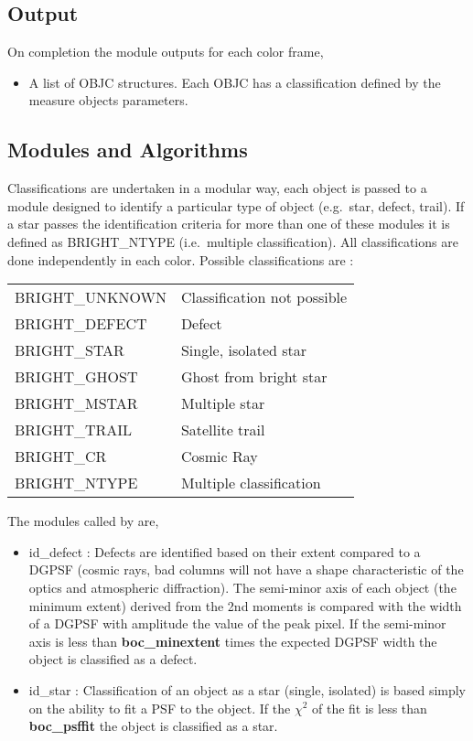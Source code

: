 \subsection{Output}
 
On completion the \bom module outputs for each color frame,
 
\begin{itemize}
 
\item A list of OBJC structures. Each OBJC has a classification
defined by the measure objects parameters.
 
\end{itemize}
 
\subsection{Modules and Algorithms}
 
Classifications are undertaken in a modular way, each object is passed to a
module designed to identify a particular type of object (e.g.\ star, 
defect, trail). If a star passes the identification criteria for more than
one of these modules it is defined as BRIGHT\_NTYPE (i.e.\ multiple
classification). All classifications are done independently in each color. 
Possible classifications are :
 
\begin{tabular}{ll}
BRIGHT\_UNKNOWN    & Classification not possible \\
BRIGHT\_DEFECT     & Defect             \\
BRIGHT\_STAR       & Single, isolated star       \\
BRIGHT\_GHOST      & Ghost from bright star      \\
BRIGHT\_MSTAR      & Multiple star               \\
BRIGHT\_TRAIL      & Satellite trail             \\
BRIGHT\_CR         & Cosmic Ray \\
BRIGHT\_NTYPE      & Multiple classification     \\
\end{tabular}
 
\noindent The modules called by \bom are,
 
\begin{itemize}
 
\item id\_defect : Defects are identified based on their extent compared to
a DGPSF (cosmic rays, bad columns will not have a shape characteristic of
the optics and atmospheric diffraction). The semi-minor axis of each
object (the minimum extent) derived from the 2nd moments is compared with the
width of a DGPSF with amplitude the value of the peak pixel. If the semi-minor 
axis is less than {\bf boc\_minextent} times the expected DGPSF width the
object is classified as a defect.
 
\item id\_star : Classification of an object as a star (single, isolated) is 
based simply on the ability to fit a PSF to the object. If the $\chi^2$
of the fit is less than {\bf boc\_psffit} the object is classified as a star.
 
 
\end{itemize}
